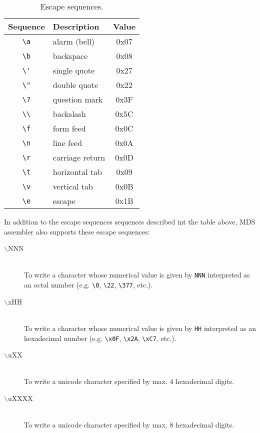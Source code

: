             \begin{table}[h!]
                \centering
                \begin{tabular}{|c|l|c|}
                    \hline
                    \textbf{Sequence} & \textbf{Description} & \textbf{Value} \\\hline
                    \verb'\a'         & alarm (bell)         & 0x07 \\\hline
                    \verb'\b'         & backspace            & 0x08 \\\hline
                    \verb"\'"         & single quote         & 0x27 \\\hline
                    \verb'\"'         & double quote         & 0x22 \\\hline
                    \verb'\?'         & question mark        & 0x3F \\\hline
                    \verb'\\'         & backslash            & 0x5C \\\hline
                    \verb'\f'         & form feed            & 0x0C \\\hline
                    \verb'\n'         & line feed            & 0x0A \\\hline
                    \verb'\r'         & carriage return      & 0x0D \\\hline
                    \verb'\t'         & horizontal tab       & 0x09 \\\hline
                    \verb'\v'         & vertical tab         & 0x0B \\\hline
                    \verb'\e'         & escape               & 0x1B \\\hline
                \end{tabular}
                \caption{Escape sequences.}
            \end{table}

            In addition to the escape sequences sequences described int the table above, MDS assembler also supports these escape sequences:
            \begin{description}
                \item[$\backslash$NNN]~\\
                    To write a character whose numerical value is given by \texttt{NNN} interpreted as an octal number (e.g. \verb'\0', \verb'\22', \verb'\377', etc.).
                \item[$\backslash$xHH]~\\
                    To write a character whose numerical value is given by \texttt{HH} interpreted as an hexadecimal number (e.g. \verb'\x0F', \verb'\x2A', \verb'\xC7', etc.).
                \item[$\backslash$uXX]~\\
                    To write a unicode character specified by max. 4 hexadecimal digits.
                \item[$\backslash$uXXXX]~\\
                    To write a unicode character specified by max. 8 hexadecimal digits.
            \end{description}

